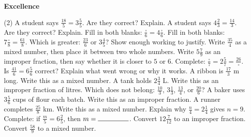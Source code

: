 \documentclass[17pt,a4paper,landscape]{extarticle}
\begin{document}
\sffamily
\boldmath

\boldmath

\vspace*{0.4em}
{\LARGE \textbf{Excellence}}
\begin{tasks}(2)
\task A student says \mbox{$\frac{18}{5}=3\frac{5}{5}$}. Are they correct? Explain.
\task A student says \mbox{$4\frac{2}{3}=\frac{14}{3}$}. Are they correct? Explain.
\task Fill in both blanks: \mbox{$\frac{\square}{6}=4\frac{\square}{6}$}.
\task Fill in both blanks: \mbox{$7\frac{\square}{8}=\frac{61}{8}$}.
\task Which is greater: \mbox{$\frac{23}{6}$} or \mbox{$3\frac{4}{5}$}? Show enough working to justify.
\task Write \mbox{$\frac{35}{4}$} as a mixed number, then place it between two whole numbers.
\task Write \mbox{$5\frac{7}{9}$} as an improper fraction, then say whether it is closer to \mbox{$5$} or \mbox{$6$}.
\task Complete: \mbox{$\frac{\square}{7}=2\frac{5}{7}=\frac{26}{\square}$}.
\task Is \mbox{$\frac{41}{6}=6\frac{5}{6}$} correct? Explain what went wrong or why it works.
\task A ribbon is \mbox{$\frac{17}{3}$} m long. Write this as a mixed number.
\task A tank holds \mbox{$2\frac{3}{4}$} L. Write this as an improper fraction of litres.
\task Which does not belong: \mbox{$\frac{10}{3}$}, \mbox{$3\frac{1}{3}$}, \mbox{$\frac{13}{4}$}, or \mbox{$\frac{20}{6}$}?
\task A baker uses \mbox{$3\frac{5}{6}$} cups of flour each batch. Write this as an improper fraction.
\task A runner completes \mbox{$\frac{25}{8}$} km. Write this as a mixed number.
\task Explain why \mbox{$\frac{n}{4}=2\frac{1}{4}$} gives \mbox{$n=9$}.
\task Complete: if \mbox{$\frac{m}{5}=6\frac{2}{5}$}, then \mbox{$m=\rule{1.6cm}{0.15mm}$}.
\task Convert \mbox{$12\frac{7}{12}$} to an improper fraction.
\task Convert \mbox{$\frac{58}{9}$} to a mixed number.
\end{tasks}
\end{document}
